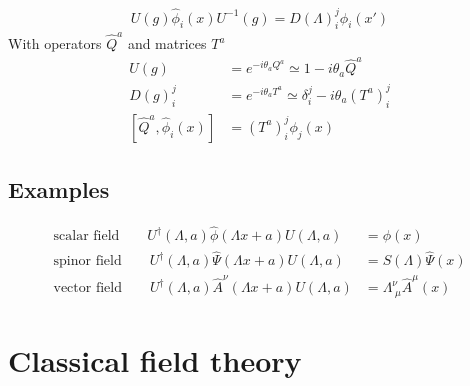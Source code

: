 \documentclass[10pt,a4paper]{report}
\theoremstyle{definition}
\begin{document}
\begin{align}
U(g)\hat{\phi}_i(x)U^{-1}(g)=D(\Lambda)^j_i\hat{\phi}_i(x')
\end{align}
With operators $\hat{Q}^a$ and matrices $T^a$ 
\begin{align}
U(g)&=e^{-i\theta_aQ^a}\simeq 1-i\theta_a \hat{Q}^a\\
D(g)_i^j&=e^{-i\theta_aT^a}\simeq \delta_i^j-i\theta_a (T^a)_i^j\\
[\hat{Q}^a,\hat{\phi}_i(x)]&=(T^a)_i^j\phi_j(x)
\end{align}

\subsection{Examples}

\begin{align}
\text{scalar field}\qquad U^\dagger(\Lambda,a)\hat\phi(\Lambda x+a)U(\Lambda,a)&=\phi(x)\\
\text{spinor field}\qquad U^\dagger(\Lambda,a)\hat\Psi(\Lambda x+a)U(\Lambda,a)&=S(\Lambda)\hat\Psi(x)\\
\text{vector field}\qquad U^\dagger(\Lambda,a)\hat{A}^\nu(\Lambda x+a)U(\Lambda,a)&=\Lambda^\nu_{\;\mu}\hat{A}^\mu(x)
\end{align}







\newpage
\section{Classical field theory}

\begin{figure}[!h]
\centering
\end{figure}
\end{document}
